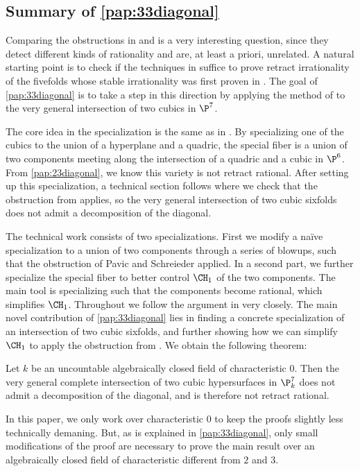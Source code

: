 \subsection{Summary of \cref{pap:33diagonal}}
Comparing the obstructions in \cite{NicaiseOttem} and \cite{PavicSchreieder} is a very interesting question, since they detect different kinds of rationality and are, at least a priori, unrelated. A natural starting point is to check if the techniques in \cite{PavicSchreieder} suffice to prove retract irrationality of the fivefolds whose stable irrationality was first proven in \cite{NicaiseOttem}. The goal of \cref{pap:33diagonal} is to take a step in this direction by applying the method of \cite{PavicSchreieder} to the very general intersection of two cubics in $\P^7$.

The core idea in the specialization is the same as in \cite[Theorem 7.2]{NicaiseOttem}. By specializing one of the cubics to the union of a hyperplane and a quadric, the special fiber is a union of two components meeting along the intersection of a quadric and a cubic in $\P^6$. From \cref{pap:23diagonal}, we know this variety is not retract rational. After setting up this specialization, a technical section follows where we check that the obstruction from \cite{PavicSchreieder} applies, so the very general intersection of two cubic sixfolds does not admit a decomposition of the diagonal.

The technical work consists of two specializations. First we modify a naïve specialization to a union of two components through a series of blowups, such that the obstruction of Pavic and Schreieder applied. In a second part, we further specialize the special fiber to better control $\CH_1$ of the two components. The main tool is specializing such that the components become rational, which simplifies $\CH_1$. Throughout we follow the argument in \cite{PavicSchreieder} very closely. The main novel contribution of \cref{pap:33diagonal} lies in finding a concrete specialization of an intersection of two cubic sixfolds, and further showing how we can simplify $\CH_1$ to apply the obstruction from \cite{PavicSchreieder}. We obtain the following theorem:
\begin{theorem}
	Let $k$ be an uncountable algebraically closed field of characteristic $0$. Then the very general complete intersection of two cubic hypersurfaces in $\P^7_k$ does not admit a decomposition of the diagonal, and is therefore not retract rational.
\end{theorem}
In this paper, we only work over characteristic $0$ to keep the proofs slightly less technically demaning. But, as is explained in \cref{pap:33diagonal}, only small modifications of the proof are necessary to prove the main result over an algebraically closed field of characteristic different from $2$ and $3$.

